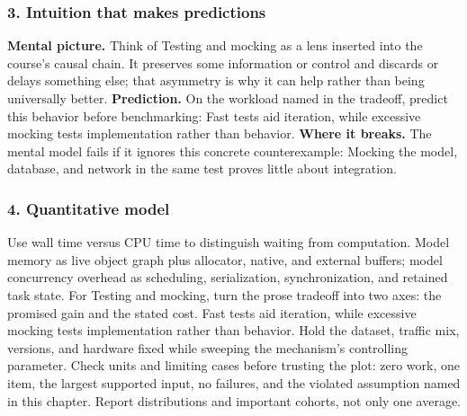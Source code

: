 \subsubsection*{3. Intuition that makes predictions}
\textbf{Mental picture.} Think of Testing and mocking as a lens inserted into the course's causal chain. It preserves some information or control and discards or delays something else; that asymmetry is why it can help rather than being universally better.
\textbf{Prediction.} On the workload named in the tradeoff, predict this behavior before benchmarking: Fast tests aid iteration, while excessive mocking tests implementation rather than behavior.
\textbf{Where it breaks.} The mental model fails if it ignores this concrete counterexample: Mocking the model, database, and network in the same test proves little about integration.
\subsubsection*{4. Quantitative model}
Use wall time versus CPU time to distinguish waiting from computation. Model memory as live object graph plus allocator, native, and external buffers; model concurrency overhead as scheduling, serialization, synchronization, and retained task state.
For Testing and mocking, turn the prose tradeoff into two axes: the promised gain and the stated cost. Fast tests aid iteration, while excessive mocking tests implementation rather than behavior. Hold the dataset, traffic mix, versions, and hardware fixed while sweeping the mechanism's controlling parameter.
Check units and limiting cases before trusting the plot: zero work, one item, the largest supported input, no failures, and the violated assumption named in this chapter. Report distributions and important cohorts, not only one average.
